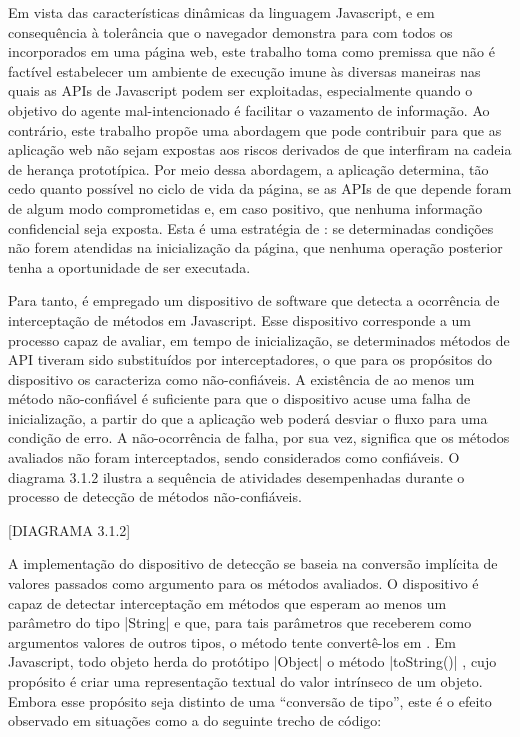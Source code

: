 Em vista das características dinâmicas da linguagem Javascript, e em consequência à tolerância que o navegador demonstra para com todos os {\scripts} incorporados em uma página web, este trabalho toma como premissa que não é factível estabelecer um ambiente de execução imune às diversas maneiras nas quais as APIs de Javascript podem ser exploitadas, especialmente quando o objetivo do agente mal-intencionado é facilitar o vazamento de informação. Ao contrário, este trabalho propõe uma abordagem que pode contribuir para que as aplicação web não sejam expostas aos riscos derivados de {\scripts} que interfiram na cadeia de herança prototípica. Por meio dessa abordagem, a aplicação determina, tão cedo quanto possível no ciclo de vida da página, se as APIs de que depende foram de algum modo comprometidas e, em caso positivo, que nenhuma informação confidencial seja exposta. Esta é uma estratégia de : se determinadas condições não forem atendidas na inicialização da página, que nenhuma operação posterior tenha a oportunidade de ser executada.

Para tanto, é empregado um dispositivo de software que detecta a ocorrência de interceptação de métodos em Javascript. Esse dispositivo corresponde a um processo capaz de avaliar, em tempo de inicialização, se determinados métodos de API tiveram sido substituídos por interceptadores, o que para os propósitos do dispositivo os caracteriza como não-confiáveis. A existência de ao menos um método não-confiável é suficiente para que o dispositivo acuse uma falha de inicialização, a partir do que a aplicação web poderá desviar o fluxo para uma condição de erro. A não-ocorrência de falha, por sua vez, significa que os métodos avaliados não foram interceptados, sendo considerados como confiáveis. O diagrama 3.1.2 ilustra a sequência de atividades desempenhadas durante o processo de detecção de métodos não-confiáveis.

[DIAGRAMA 3.1.2]

A implementação do dispositivo de detecção se baseia na conversão implícita de valores passados como argumento para os métodos avaliados. O dispositivo é capaz de detectar interceptação em métodos que esperam ao menos um parâmetro do tipo |String| e que, para tais parâmetros que receberem como argumentos valores de outros tipos, o método tente convertê-los em . Em Javascript, todo objeto herda do protótipo |Object| o método |toString()| \cite[seção 19.1]{ECMA2017}, cujo propósito é criar uma representação textual do valor intrínseco de um objeto. Embora esse propósito seja distinto de uma ``conversão de tipo'', este é o efeito observado em situações como a do seguinte trecho de código:

